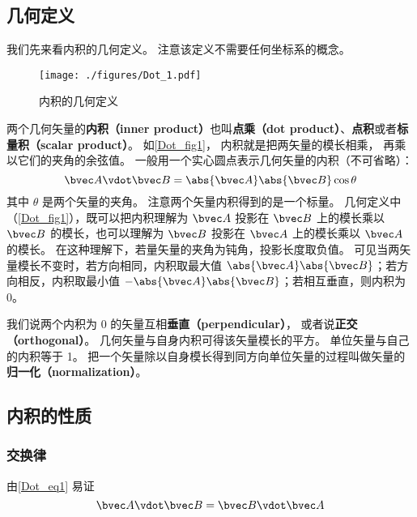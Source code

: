 

\subsection{几何定义}
我们先来看内积的几何定义。 注意该定义不需要任何坐标系的概念。
\begin{figure}[th]
\centering
\texttt{[image: ./figures/Dot\_1.pdf]}
\caption{内积的几何定义}\label{Dot_fig1}
\end{figure}

两个几何矢量的\textbf{内积（inner product）}也叫\textbf{点乘（dot product）}、\textbf{点积}或者\textbf{标量积（scalar product）}。 如\autoref{Dot_fig1}， 内积就是把两矢量的模长相乘， 再乘以它们的夹角的余弦值。 一般用一个实心圆点表示几何矢量的内积（不可省略）：
\begin{equation}\label{Dot_eq1}
\bvec A \vdot \bvec B = \abs{\bvec A} \abs{\bvec B} \cos\theta 
\end{equation}
其中 $\theta$ 是两个矢量的夹角。 注意两个矢量内积得到的是一个标量。 几何定义中（\autoref{Dot_fig1}），既可以把内积理解为 $\bvec A$ 投影在 $\bvec B$ 上的模长乘以 $\bvec B$ 的模长，也可以理解为 $\bvec B$ 投影在 $\bvec A$ 上的模长乘以 $\bvec A$ 的模长。 在这种理解下，若量矢量的夹角为钝角，投影长度取负值。 可见当两矢量模长不变时，若方向相同，内积取最大值 $\abs{\bvec A}\abs{\bvec B}$；若方向相反，内积取最小值 $-\abs{\bvec A}\abs{\bvec B}$；若相互垂直，则内积为 0。

我们说两个内积为 0 的矢量互相\textbf{垂直（perpendicular）}， 或者说\textbf{正交（orthogonal）}。 几何矢量与自身内积可得该矢量模长的平方。 单位矢量与自己的内积等于 1。 把一个矢量除以自身模长得到同方向单位矢量的过程叫做矢量的\textbf{归一化（normalization）}。

\subsection{内积的性质}

\subsubsection{交换律}
由\autoref{Dot_eq1} 易证
\begin{equation}\label{Dot_eq2}
\bvec A \vdot \bvec B = \bvec B \vdot \bvec A
\end{equation}

